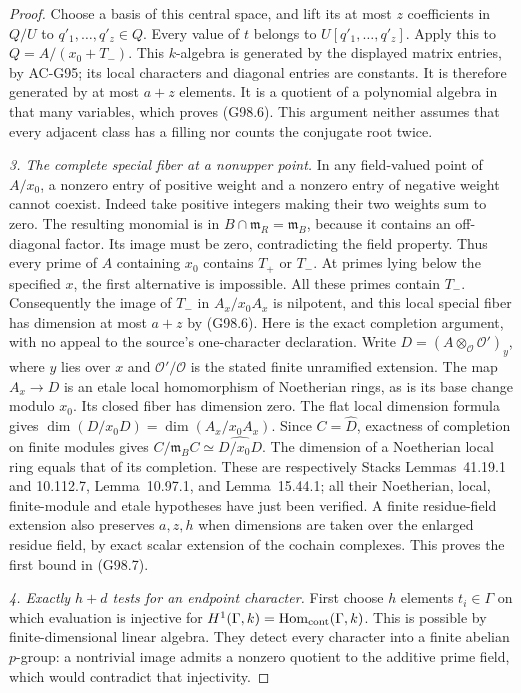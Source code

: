\begin{proof}
Choose a basis of this central space, and lift its at most $z$
coefficients in $Q/U$ to $q'_1,\ldots,q'_z\in Q$.
Every value of $t$ belongs to $U[q'_1,\ldots,q'_z]$.
Apply this to $Q=A/(x_0+T_-)$.
This $k$-algebra is generated by the displayed matrix entries,
by AC-G95; its local characters and diagonal entries are constants.
It is therefore generated by at most $a+z$ elements.
It is a quotient of a polynomial algebra in that many variables,
which proves (G98.6).  This argument neither assumes that every
adjacent class has a filling nor counts the conjugate root twice.

\emph{3. The complete special fiber at a nonupper point.}
In any field-valued point of $A/x_0$, a nonzero entry of positive
weight and a nonzero entry of negative weight cannot coexist.
Indeed take positive integers making their two weights sum to zero.
The resulting monomial is in $B\cap\mathfrak m_R=\mathfrak m_B$,
because it contains an off-diagonal factor.  Its image must be zero,
contradicting the field property.  Thus every prime of $A$ containing
$x_0$ contains $T_+$ or $T_-$.
At primes lying below the specified $x$, the first alternative is
impossible.  All these primes contain $T_-$.
Consequently the image of $T_-$ in $A_x/x_0A_x$ is nilpotent,
and this local special fiber has dimension at most $a+z$ by (G98.6).
Here is the exact completion argument, with no appeal to the
source's one-character declaration.  Write
$D=(A\otimes_{\mathcal O}\mathcal O')_y$, where $y$ lies over
$x$ and $\mathcal O'/\mathcal O$ is the stated finite unramified
extension.  The map $A_x\to D$ is an etale local homomorphism
of Noetherian rings, as is its base change modulo $x_0$.
Its closed fiber has dimension zero.  The flat local dimension
formula gives
$\dim(D/x_0D)=\dim(A_x/x_0A_x)$.
Since $C=\widehat D$, exactness of completion on finite modules
gives $C/\mathfrak m_BC\simeq\widehat{D/x_0D}$.
The dimension of a Noetherian local ring equals that of its
completion.  These are respectively Stacks Lemmas~41.19.1 and
10.112.7, Lemma~10.97.1, and Lemma~15.44.1; all their Noetherian,
local, finite-module and etale hypotheses have just been verified.
A finite residue-field extension also preserves $a,z,h$ when
dimensions are taken over the enlarged residue field, by exact
scalar extension of the cochain complexes.
This proves the first bound in (G98.7).

\emph{4. Exactly $h+d$ tests for an endpoint character.}
First choose $h$ elements $t_i\in\Gamma$ on which evaluation
is injective for $H^1(\Gamma,k)=\operatorname{Hom}_{\rm cont}(\Gamma,k)$.
This is possible by finite-dimensional linear algebra.
They detect every character into a finite abelian $p$-group:
a nontrivial image admits a nonzero quotient to the additive
prime field, which would contradict that injectivity.


\end{proof}
